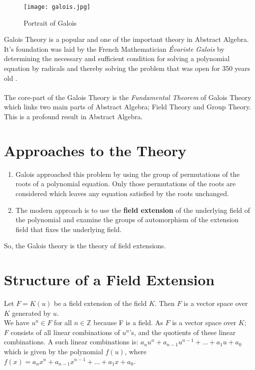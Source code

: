 \begin{wrapfigure}{r}{0.3\textwidth}
  \texttt{[image: galois.jpg]}
  \caption{\footnotesize Portrait of Galois}
\end{wrapfigure}

Galois Theory is a popular and one of the important theory in Abstract Algebra. It's foundation was laid by the French Mathematician \textit{Évariste Galois} by determining the necessary and sufficient condition for solving a polynomial equation by radicals and thereby solving the problem that was open for 350 years old \cite{galois}.\\ \\
The core-part of the Galois Theory is the \textit{Fundamental Theorem} of Galois Theory which links two main parts of Abstract Algebra; Field Theory and Group Theory. This is a profound result in Abstract Algebra.

\vspace{15mm}
\section{Approaches to the Theory}
\begin{enumerate}
\item Galois approached this problem by using the group of permutations of the roots of a polynomial equation. Only those permutations of the roots are considered which leaves any equation satisfied by the roots unchanged.

\item The modern approach is to use the \textbf{field extension} of the underlying field of the polynomial and examine the groups of automorphism of the extension field that fixes the underlying field.
\end{enumerate}
So, the Galois theory is the theory of field extensions.
\clearpage

\section{Structure of a Field Extension}
Let \(F=K(u)\) be a field extension of the field \(K\). Then \(F\) is a vector space over \(K\) generated by \(u\).\\
We have \(u^n \in F\) for all \(n \in \mathbb{Z}\) because F is a field. As \(F\) is a vector space over \(K\); \(F\) consists of all linear combinations of \(u^n \)'s, and the quotients of these linear combinations. A such linear combinations is: \(a_nu^n+a_{n-1}u^{n-1}+...+a_1u+a_0\) which is  given by the polynomial \(f(u)\), where \(f(x)=a_nx^n+a_{n-1}x^{n-1}+...+a_1x+a_0\).\\

